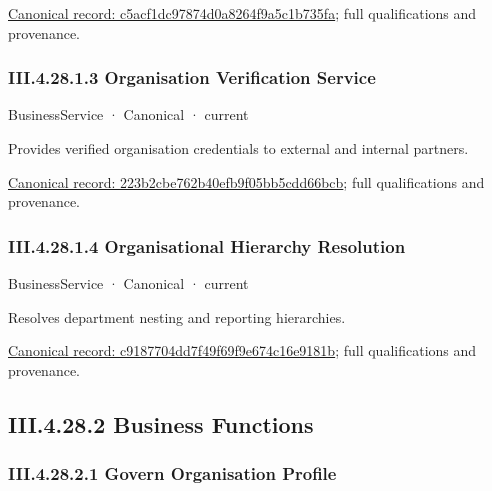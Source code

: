 {\footnotesize \href{../../../../continuum/business/business-service/c5acf1dc97874d0a8264f9a5c1b735fa.md}{Canonical record: c5acf1dc97874d0a8264f9a5c1b735fa}; full qualifications and provenance.}\par
\subsubsection*{III.4.28.1.3 Organisation Verification Service}
\label{navigation:III.4.28.1.3}

\label{element:223b2cbe762b40efb9f05bb5cdd66bcb}
{\small BusinessService · Canonical · current}\par

Provides verified organisation credentials to external and internal partners.


{\footnotesize \href{../../../../continuum/business/business-service/223b2cbe762b40efb9f05bb5cdd66bcb.md}{Canonical record: 223b2cbe762b40efb9f05bb5cdd66bcb}; full qualifications and provenance.}\par
\subsubsection*{III.4.28.1.4 Organisational Hierarchy Resolution}
\label{navigation:III.4.28.1.4}

\label{element:c9187704dd7f49f69f9e674c16e9181b}
{\small BusinessService · Canonical · current}\par

Resolves department nesting and reporting hierarchies.


{\footnotesize \href{../../../../continuum/business/business-service/c9187704dd7f49f69f9e674c16e9181b.md}{Canonical record: c9187704dd7f49f69f9e674c16e9181b}; full qualifications and provenance.}\par
\subsection*{III.4.28.2 Business Functions}
\label{navigation:III.4.28.2}

\subsubsection*{III.4.28.2.1 Govern Organisation Profile}
\label{navigation:III.4.28.2.1}

